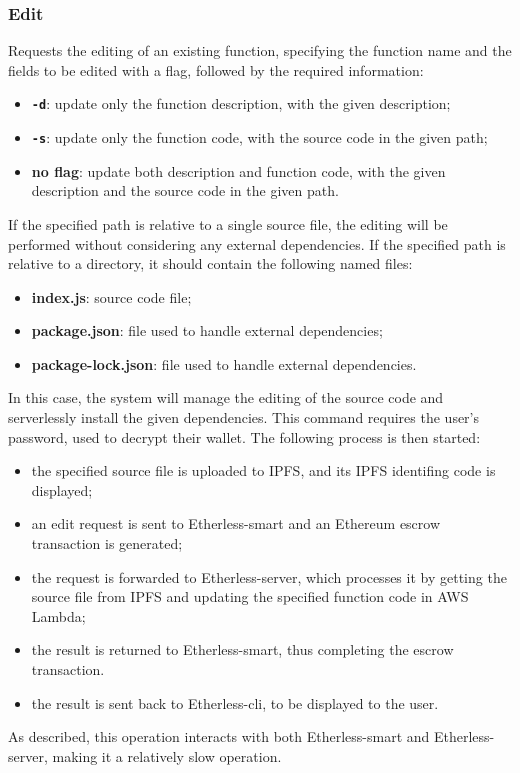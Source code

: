 	\subsubsection{Edit}
	Requests the editing of an existing function, specifying the function name and the fields to be edited with a flag, followed by the required information:
	\begin{itemize}
		\item \textbf{\texttt{-d}}: update only the function description, with the given description;
		\item \textbf{\texttt{-s}}: update only the function code, with the source code in the given path;
		\item \textbf{no flag}: update both description and function code, with the given description and the source code in the given path.
	\end{itemize}
	If the specified path is relative to a single source file, the editing will be performed without considering any external dependencies. If the specified path is relative to a directory, it should contain the following named files:
	\begin{itemize}
		\item \textbf{index.js}: source code file;
		\item \textbf{package.json}: file used to handle external dependencies;
		\item \textbf{package-lock.json}: file used to handle external dependencies.
	\end{itemize}
	In this case, the system will manage the editing of the source code and serverlessly install the given dependencies. This command requires the user's password, used to decrypt their wallet. The following process is then started:
	\begin{itemize}
		\item the specified source file is uploaded to IPFS, and its IPFS identifing code is displayed;
		\item an edit request is sent to Etherless-smart and an Ethereum escrow transaction is generated;
		\item the request is forwarded to Etherless-server, which processes it by getting the source file from IPFS and updating the specified function code in AWS Lambda;
		\item the result is returned to Etherless-smart, thus completing the escrow transaction.
		\item the result is sent back to Etherless-cli, to be displayed to the user.
	\end{itemize}
	As described, this operation interacts with both Etherless-smart and Etherless-server, making it a relatively slow operation.
